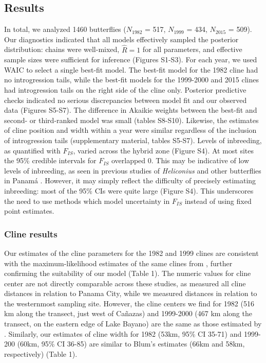 \documentclass[]{article}
\begin{document}
\subsection{Results}\label{results}

In total, we analyzed 1460 butterflies (\(N_{1982}\) = 517, \(N_{1999}\)
= 434, \(N_{2015}\) = 509). Our diagnostics indicated that all models
effectively sampled the posterior distribution: chains were well-mixed,
\(\hat{R} = 1\) for all parameters, and effective sample sizes were
sufficient for inference (Figures S1-S3). For each year, we used WAIC to
select a single best-fit model. The best-fit model for the 1982 cline
had no introgression tails, while the best-fit models for the 1999-2000
and 2015 clines had introgression tails on the right side of the cline
only. Posterior predictive checks indicated no serious discrepancies
between model fit and our observed data (Figures S5-S7). The difference
in Akaikie weights between the best-fit and second- or third-ranked
model was small (tables S8-S10). Likewise, the estimates of cline
position and width within a year were similar regardless of the
inclusion of introgression tails (supplementary material, tables S5-S7).
Levels of inbreeding, as quantified with \(F_{IS}\), varied across the
hybrid zone (Figure S4). At most sites the 95\% credible intervals for
\(F_{IS}\) overlapped 0. This may be indicative of low levels of
inbreeding, as seen in previous studies of \textit{Heliconius} and other
butterflies in Panamá \citep{Mallet:1986vj,Dasmahapatra2002}. However,
it may simply reflect the difficulty of precisely estimating inbreeding:
most of the 95\% CIs were quite large (Figure S4). This underscores the
need to use methods which model uncertainty in \(F_{IS}\) instead of
using fixed point estimates.

\subsubsection{Cline results}\label{cline-results}

Our estimates of the cline parameters for the 1982 and 1999 clines are
consistent with the maximum-likelihood estimates of the same clines from
\citet{Blum:2002wr}, further confirming the suitability of our model
(Table 1). The numeric values for cline center are not directly
comparable across these studies, as \citeauthor{Blum:2002wr} measured
all cline distances in relation to Panama City, while we measured
distances in relation to the westernmost sampling site. However, the
cline centers we find for 1982 (516 km along the transect, just west of
Cañazas) and 1999-2000 (467 km along the transect, on the eastern edge
of Lake Bayano) are the same as those estimated by \citet{Blum:2002wr}.
Similarly, our estimates of cline width for 1982 (53km, 95\% CI 35-71)
and 1999-200 (60km, 95\% CI 36-85) are similar to Blum's estimates (66km
and 58km, respectively) (Table 1).
\end{document}
